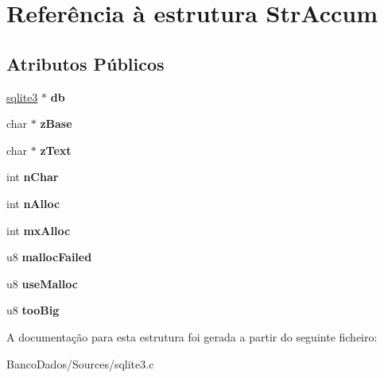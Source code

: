 \hypertarget{struct_str_accum}{\section{Referência à estrutura Str\-Accum}
\label{struct_str_accum}
}
\subsection*{Atributos Públicos}
\begin{DoxyCompactItemize}
\item 
\hypertarget{struct_str_accum_ade44091c9a91671c9457b9e4a98a9a5d}{\hyperlink{structsqlite3}{sqlite3} $\ast$ {\bfseries db}}\label{struct_str_accum_ade44091c9a91671c9457b9e4a98a9a5d}

\item 
\hypertarget{struct_str_accum_a5797e2f288573ee98a4025f0f96fe50d}{char $\ast$ {\bfseries z\-Base}}\label{struct_str_accum_a5797e2f288573ee98a4025f0f96fe50d}

\item 
\hypertarget{struct_str_accum_ac45a51cb7b85da2ae9865eac21d416dc}{char $\ast$ {\bfseries z\-Text}}\label{struct_str_accum_ac45a51cb7b85da2ae9865eac21d416dc}

\item 
\hypertarget{struct_str_accum_a88bf779588ca597a41fde3e41186e003}{int {\bfseries n\-Char}}\label{struct_str_accum_a88bf779588ca597a41fde3e41186e003}

\item 
\hypertarget{struct_str_accum_ae2f21c484b737b9903e695977c27815a}{int {\bfseries n\-Alloc}}\label{struct_str_accum_ae2f21c484b737b9903e695977c27815a}

\item 
\hypertarget{struct_str_accum_ab9985e4aabc65bebbf026881ce0b59bd}{int {\bfseries mx\-Alloc}}\label{struct_str_accum_ab9985e4aabc65bebbf026881ce0b59bd}

\item 
\hypertarget{struct_str_accum_a6bc89e5ed8495ddcddadf0940f236c84}{u8 {\bfseries malloc\-Failed}}\label{struct_str_accum_a6bc89e5ed8495ddcddadf0940f236c84}

\item 
\hypertarget{struct_str_accum_abc135ceee2e63f41c101aceca5e9417b}{u8 {\bfseries use\-Malloc}}\label{struct_str_accum_abc135ceee2e63f41c101aceca5e9417b}

\item 
\hypertarget{struct_str_accum_ae5b62e58c33302b44fedf0e204757ced}{u8 {\bfseries too\-Big}}\label{struct_str_accum_ae5b62e58c33302b44fedf0e204757ced}

\end{DoxyCompactItemize}


A documentação para esta estrutura foi gerada a partir do seguinte ficheiro\-:\begin{DoxyCompactItemize}
\item 
Banco\-Dados/\-Sources/sqlite3.\-c\end{DoxyCompactItemize}
